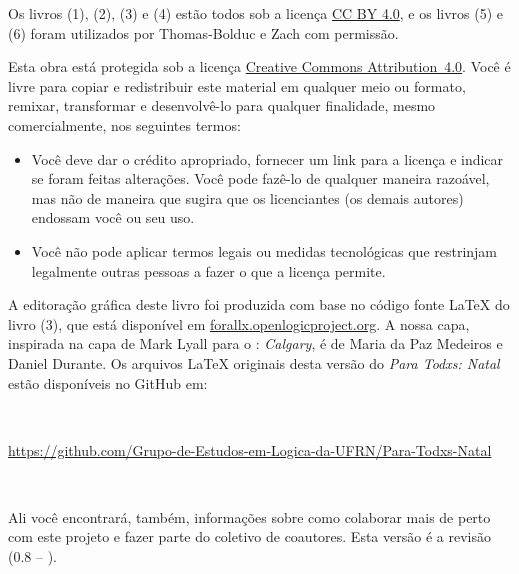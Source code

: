 Os livros (1), (2), (3) e (4) estão todos sob a licença \href{https://creativecommons.org/licenses/by/4.0/}{CC BY 4.0}, e os livros (5) e (6) foram utilizados por Thomas-Bolduc e Zach com permissão.\label{cc4by}




Esta obra está protegida sob a licença \href{https://creativecommons.org/licenses/by/4.0/}{Creative Commons \hbox{Attribution 4.0}}. 
Você é livre para copiar e redistribuir este material em qualquer meio ou formato, remixar, transformar e desenvolvê-lo para qualquer finalidade, mesmo comercialmente, nos seguintes termos:
\begin{itemize}
\item Você deve dar o crédito apropriado, fornecer um link para a licença e indicar se foram feitas alterações. Você pode fazê-lo de qualquer maneira razoável, mas não de maneira que sugira que os licenciantes (os demais autores) endossam você ou seu uso.
\item Você não pode aplicar termos legais ou medidas tecnológicas que restrinjam legalmente outras pessoas a fazer o que a licença permite.
\end{itemize}

\noindent A editoração gráfica deste livro foi produzida com base no código fonte \LaTeX{} do livro (3),  que está disponível em \hbox{\href{https://forallx.openlogicproject.org}{forallx.openlogicproject.org}}.
A nossa capa, inspirada na capa de Mark Lyall para o \forallx: \textit{Calgary}, é de Maria da Paz Medeiros e Daniel Durante.
Os arquivos  \LaTeX{} originais desta versão do \textit{Para Todxs: Natal} estão disponíveis no GitHub em:

\

\hbox{{\footnotesize \url{https://github.com/Grupo-de-Estudos-em-Logica-da-UFRN/Para-Todxs-Natal}}} 

\

\noindent Ali você encontrará, também, informações sobre como colaborar mais de perto com este projeto e fazer parte do coletivo de coautores.
Esta versão é a revisão (0.8 -- \mydate).



